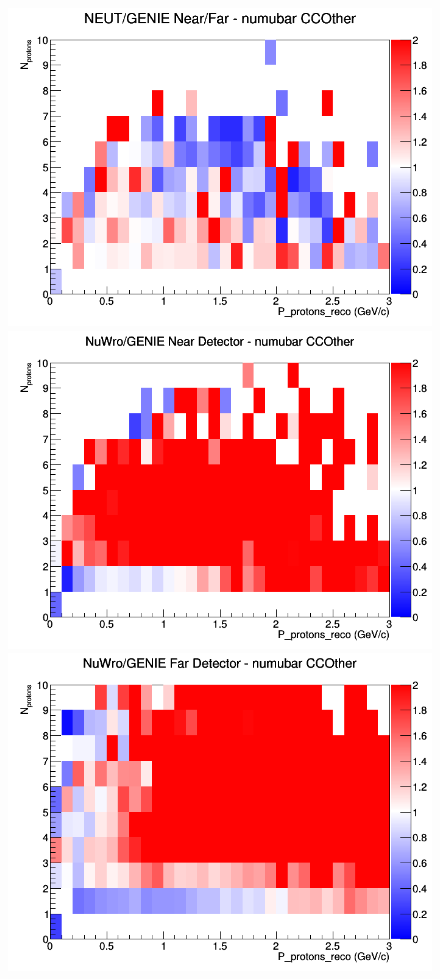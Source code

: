 \documentclass[12pt]{article}
\begin{document}
\begin{figure}[h]
\endminipage
{}
\includegraphics[width=\linewidth]{eff_N_P/FGT/protons/ratios/CCOther_NEUT_GENIE_numubar_NF_N_P.png}
\endminipage
\newline
{}
\includegraphics[width=\linewidth]{eff_N_P/FGT/protons/ratios/CCOther_NuWro_GENIE_numubar_near_N_P.png}
\endminipage
{}
\includegraphics[width=\linewidth]{eff_N_P/FGT/protons/ratios/CCOther_NuWro_GENIE_numubar_far_N_P.png}

\end{figure}
\end{document}
